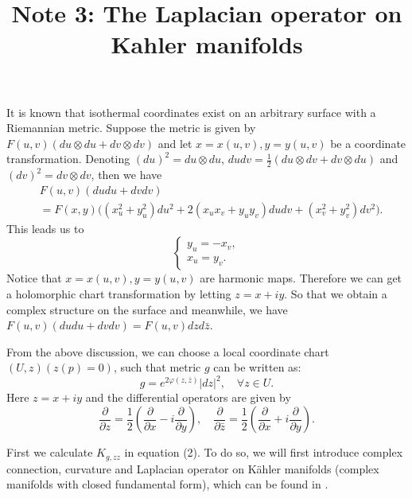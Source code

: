 \documentclass{ctexart}
\title{Note 3: The Laplacian operator on Kahler manifolds}
\date{} %
\begin{document}
\maketitle

It is known that isothermal coordinates exist on an arbitrary surface with a Riemannian metric. Suppose the metric is given by 
$F(u, v)(d u \otimes d u+d v \otimes d v)$ and let $x=x(u, v), y=y(u, v)$ be a coordinate transformation. Denoting 
$(d u)^2=d u \otimes d u$, $d u d v=\frac{1}{2}(d u \otimes d v+d v \otimes d u)$ and $(d v)^2=d v \otimes d v$, then we have
$$
\begin{aligned}
&F(u, v)(d u  d u+d v  d v) \\
&=F(x, y)\big((x_u^2+y_u^2) d u^2+2(x_u x_v+y_u y_v) d u  d v +(x_v^2+y_v^2) d v^2\big).
\end{aligned}
$$
This leads us to 
$$
\left\{\begin{array}{c}y_u=-x_v, \\ x_u=y_v. \end{array}\right.
$$ 
Notice that $x=x(u, v), y=y(u, v)$ are harmonic maps. Therefore we can get a holomorphic chart transformation by letting $z=x+i y$. 
So that we obtain a complex structure on the surface and meanwhile, we have $F(u, v)(d u  d u+d v  d v) = F(u,v)dzd\bar{z}$.

From the above discussion, we can choose a local coordinate chart $(U, z)(z(p)=0)$, such that metric $g$ can be written as: 
$$
g=e^{2 \varphi(z, \bar{z})}|d z|^2, \quad \forall z \in U.
$$
Here $z=x+i y$ and the differential operators are given by  
\begin{equation*}
  \frac{\partial}{\partial z}=\frac{1}{2}\left(\frac{\partial}{\partial x}-i \frac{\partial}{\partial y}\right), 
  \quad \frac{\partial}{\partial \bar{z}}=\frac{1}{2}\left(\frac{\partial}{\partial x}+i \frac{\partial}{\partial y}\right).
\end{equation*}

First we calculate $K_{g, z z}$ in equation (2). To do so, we will first introduce complex connection, curvature and Laplacian operator 
on K\"ahler manifolds (complex manifolds with closed fundamental form), which can be found in \cite{Szekelyhidi2014}. 
\end{document}
